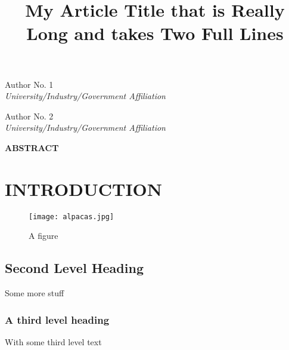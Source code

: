 \documentclass[12pt,letterpaper]{article}
\title{My Article Title that is Really Long and takes Two Full Lines}
\newenvironment{nscenter}
 {\parskip=0pt\par\nopagebreak\centering}
 {\par\noindent\ignorespacesafterend}
\newcommand{\affiliatedauthor}[2]{
\begin{nscenter}
	#1 \\ \textit{#2}
\end{nscenter}
}
\renewcommand{\abstractname}{ABSTRACT}
\renewenvironment{abstract}
 {\vspace{-0.5ex}
  \small
  \begin{center}
  	\bfseries \abstractname\vspace{-4ex}\vspace{0pt}
  \end{center}
  \list{}{
    \setlength{\leftmargin}{0.5in}
    \setlength{\rightmargin}{\leftmargin}
  }
  \item\relax}
 {\endlist}
\begin{document}
\begin{center}
	\textbf{\LARGE{\thetitle}}
\end{center}

\affiliatedauthor{Author No. 1}{University/Industry/Government Affiliation}
\affiliatedauthor{Author No. 2}{University/Industry/Government Affiliation}


\begin{abstract}
\lipsum[1]
\end{abstract}


\section*{INTRODUCTION}
\lipsum[2]

\begin{figure}[h]
	\texttt{[image: alpacas.jpg]}
    \caption{A figure}
\end{figure}

\lipsum[3]

\subsection*{Second Level Heading}
Some more stuff

\subsubsection*{A third level heading}
With some third level text
\end{document}
